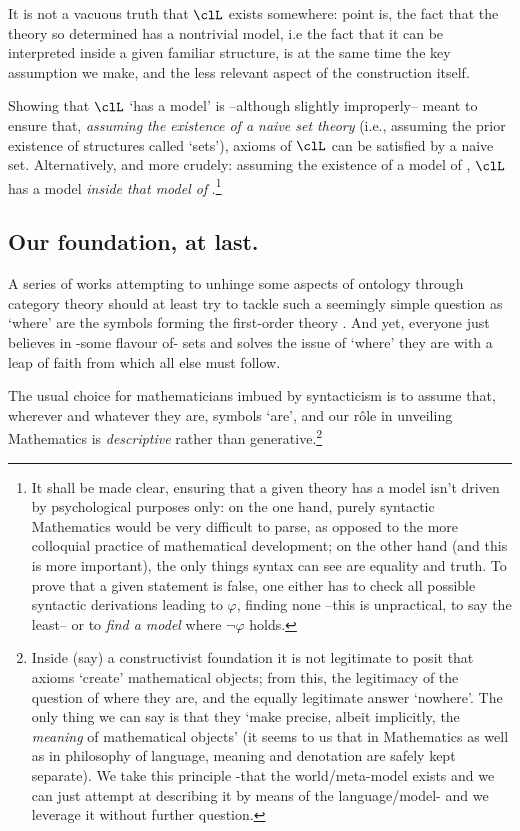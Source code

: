 It is not a vacuous truth that $\clL$ exists somewhere: point is, the fact that the theory so determined has a nontrivial model, i.e the fact that it can be interpreted inside a given familiar structure, is at the same time the key assumption we make, and the less relevant aspect of the construction itself.

Showing that $\clL$ `has a model' is --although slightly improperly-- meant to ensure that, \emph{assuming the existence of a naive set theory} (i.e., assuming the prior existence of structures called `sets'), axioms of $\clL$ can be satisfied by a naive set. Alternatively, and more crudely: assuming the existence of a model of , $\clL$ has a model \emph{inside that model of }.\footnote{It shall be made clear, ensuring that a given theory has a model isn't driven by psychological purposes only: on the one hand, purely syntactic Mathematics would be very difficult to parse, as opposed to the more colloquial practice of mathematical development; on the other hand (and this is more important), the only things syntax can see are equality and truth. To prove that a given statement is false, one either has to check all possible syntactic derivations leading to $\varphi$, finding none --this is unpractical, to say the least-- or to \emph{find a model} where $\lnot\varphi$ holds.}

\subsection{Our foundation, at last.} A series of works attempting to unhinge some aspects of ontology through category theory should at least try to tackle such a seemingly simple question as `where' are the symbols forming the first-order theory . And yet, everyone just believes in -some flavour of- sets and solves the issue of `where' they are with a leap of faith from which all else must follow.



The usual choice for mathematicians imbued by syntacticism is to assume that, wherever and whatever they are, symbols `are', and our r\^ole in unveiling Mathematics is \emph{descriptive} rather than generative.\footnote{Inside (say) a constructivist foundation it is not legitimate to posit that axioms `create' mathematical objects; from this, the legitimacy of the question of where they are, and the equally legitimate answer `nowhere'. The only thing we can say is that they `make precise, albeit implicitly, the \emph{meaning} of mathematical objects' \cite{Agzz} (it seems to us that in Mathematics as well as in philosophy of language, meaning and denotation are safely kept separate). We take this principle -that the world/meta\hyp{}model exists and we can just attempt at describing it by means of the language/model- and we leverage it without further question.}

